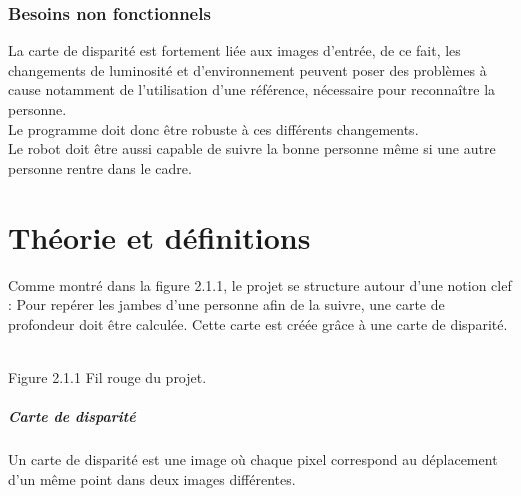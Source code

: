 \documentclass[12pt,a4paper]{report}
\begin{document}
\subsection{Besoins non fonctionnels}
	La carte de disparité est fortement liée aux images d'entrée, de ce fait, les changements de luminosité et d'environnement peuvent poser des problèmes à cause notamment de l'utilisation d'une référence, nécessaire pour reconnaître la personne.\\
	Le programme doit donc être robuste à ces différents changements.\\
	Le robot doit être aussi capable de suivre la bonne personne même si une autre personne rentre dans le cadre.
	
\chapter{Théorie et définitions}

Comme montré dans la figure 2.1.1, le projet se structure autour d'une notion clef : Pour repérer les jambes d'une personne afin de la suivre, une carte de profondeur doit être calculée. Cette carte est créée grâce à une carte de disparité. 

\begin{center}
\\
Figure 2.1.1 Fil rouge du projet.
\end{center}

\paragraph{Carte de disparité}
Un carte de disparité est une image où chaque pixel correspond au déplacement d'un même point dans deux images différentes. 
\end{document}
